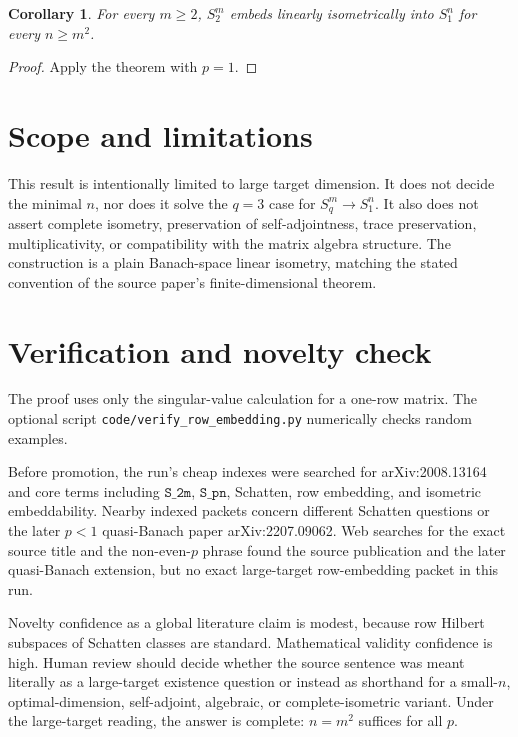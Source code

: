 \documentclass[11pt]{article}
\newtheorem{corollary}{Corollary}
\begin{document}
\begin{corollary}
For every \(m\ge 2\), \(S_2^m\) embeds linearly isometrically into \(S_1^n\) for every \(n\ge m^2\).
\end{corollary}

\begin{proof}
Apply the theorem with \(p=1\).
\end{proof}

\section{Scope and limitations}

This result is intentionally limited to large target dimension. It does not decide the minimal \(n\), nor does it solve the \(q=3\) case for \(S_q^m\to S_1^n\). It also does not assert complete isometry, preservation of self-adjointness, trace preservation, multiplicativity, or compatibility with the matrix algebra structure. The construction is a plain Banach-space linear isometry, matching the stated convention of the source paper's finite-dimensional theorem.

\section{Verification and novelty check}

The proof uses only the singular-value calculation for a one-row matrix. The optional script \texttt{code/verify\_row\_embedding.py} numerically checks random examples.

Before promotion, the run's cheap indexes were searched for arXiv:2008.13164 and core terms including \(\texttt{S\_2\^m}\), \(\texttt{S\_p\^n}\), Schatten, row embedding, and isometric embeddability. Nearby indexed packets concern different Schatten questions or the later \(p<1\) quasi-Banach paper arXiv:2207.09062. Web searches for the exact source title and the non-even-\(p\) phrase found the source publication and the later quasi-Banach extension, but no exact large-target row-embedding packet in this run.

Novelty confidence as a global literature claim is modest, because row Hilbert subspaces of Schatten classes are standard. Mathematical validity confidence is high. Human review should decide whether the source sentence was meant literally as a large-target existence question or instead as shorthand for a small-\(n\), optimal-dimension, self-adjoint, algebraic, or complete-isometric variant. Under the large-target reading, the answer is complete: \(n=m^2\) suffices for all \(p\).
\end{document}

